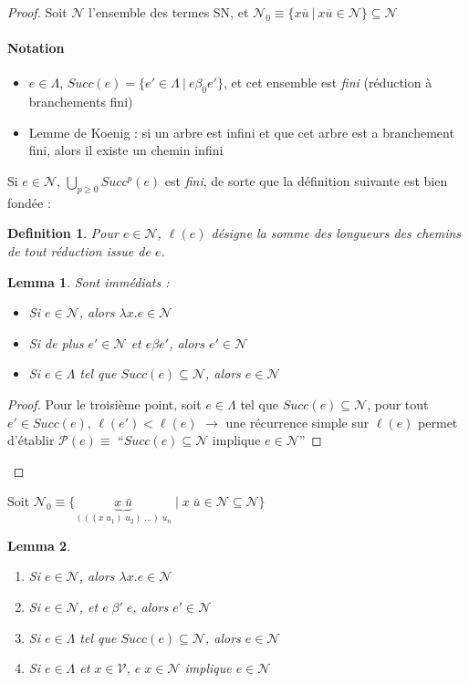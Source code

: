 \documentclass{article}
\newtheorem{lemma}{Lemma}
\newtheorem{defi}{Definition}
\newcommand\lterm[2]{\lambda #1. #2}
\begin{document}
\begin{proof}
Soit $\mathcal{N}$ l'ensemble des termes SN, et $\mathcal{N}_0 \equiv \{  x\overline{u} \:|\: x\overline{u} \in \mathcal{N}\} \subseteq \mathcal{N}$
\paragraph{Notation}
\begin{itemize}
\item $e\in \Lambda$, $Succ(e)=\{e'\in \Lambda \:|\: e\beta_0 e' \}$, et cet ensemble est \emph{fini} (réduction à branchements fini)
\item Lemme de Koenig : si un arbre est infini et que cet arbre est a branchement fini, alors il existe un chemin infini
\end{itemize}

Si $e\in \mathcal{N}$, $\bigcup_{p\geq 0} Succ^p (e)$ est \emph{fini}, de sorte que la définition suivante est bien fondée :

\begin{defi}
Pour $e\in \mathcal{N}$, $\ell(e)$ désigne la somme des longueurs des chemins de tout réduction issue de $e$.
\end{defi}

\begin{lemma}
Sont immédiats :
\begin{itemize}
\item Si $e\in \mathcal{N}$, alors $\lterm{x}{e} \in \mathcal{N}$
\item Si de plus $e' \in \mathcal{N}$ et $e \beta e'$, alors $e' \in \mathcal{N}$
\item Si $e \in \Lambda$ tel que $Succ(e)\subseteq \mathcal{N}$, alors $e\in \mathcal{N}$
\end{itemize}
\end{lemma}
\begin{proof}
Pour le troisième point, soit $e\in \Lambda$ tel que $Succ(e)\subseteq \mathcal{N}$, pour tout $e' \in Succ(e)$, $\ell (e') < \ell(e)$ $\to$ une récurrence simple sur $\ell(e)$ permet d'établir $\mathcal{P}(e) \equiv$ ``$Succ(e) \subseteq \mathcal{N}$ implique $e\in \mathcal{N}$''
\end{proof}

\end{proof}

Soit $\mathcal{N}_0\equiv \{ \underbrace{x\;\bar{u}}_{(((x\; u_1)\; u_2)\; ...)\; u_n} \;|\; x\;\bar{u} \in \mathcal{N} \subseteq \mathcal{N}\}$
\begin{lemma}
\begin{enumerate}[label=\roman*)]
\item Si $e\in \mathcal{N}$, alors $\lterm{x}{e}\in \mathcal{N}$
\item Si $e \in \mathcal{N}$, et $e\; \beta'\; e$, alors $e'\in \mathcal{N}$
\item Si $e \in \Lambda$ tel que $Succ(e)\subseteq \mathcal{N}$, alors $e\in \mathcal{N}$
\item Si $e\in \Lambda$ et $x\in \mathcal{V}$, $e\; x \in \mathcal{N}$ implique $e\in \mathcal{N}$ 
\end{enumerate}
\end{lemma}
\end{document}
